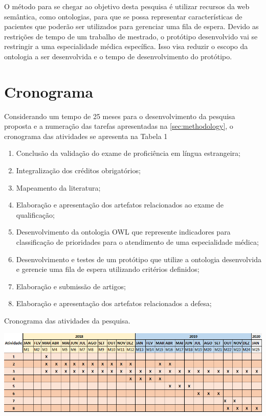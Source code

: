 	O método para se chegar ao objetivo desta pesquisa é utilizar recursos da web semântica, como ontologias, para que se possa representar características de pacientes que poderão ser utilizados para gerenciar uma fila de espera. Devido as restrições de tempo de um trabalho de mestrado, o protótipo desenvolvido vai se restringir a uma especialidade médica específica. Isso visa reduzir o escopo da ontologia a ser desenvolvida e o tempo de desenvolvimento do protótipo.

    \section{Cronograma}

	Considerando um tempo de 25 meses para o desenvolvimento da pesquisa proposta e a numeração das tarefas apresentadas na \autoref{sec:methodology}, o cronograma das atividades se apresenta na Tabela 1 %
	
	  \begin{enumerate}
    	\item Conclusão da validação do exame de proficiência em língua estrangeira;
        \item Integralização dos créditos obrigatórios;
        \item Mapeamento da literatura;
        \item Elaboração e apresentação dos artefatos relacionados ao exame de qualificação;
         \item Desenvolvimento da ontologia OWL que represente indicadores para classificação de prioridades para o atendimento de uma especialidade médica;
        \item Desenvolvimento e testes de um protótipo que utilize a ontologia desenvolvida e gerencie uma fila de espera utilizando critérios definidos;
        \item Elaboração e submissão de artigos;
        \item Elaboração e apresentação dos artefatos relacionados a defesa;
    \end{enumerate}
    
    \begin{table}[htbp]
    	\centering
        \caption{Cronograma das atividades da pesquisa.}
        \label{tab:cronogram}
        \includegraphics[width=1\linewidth]{images/cronogram}
        \fautor
    \end{table}
    
